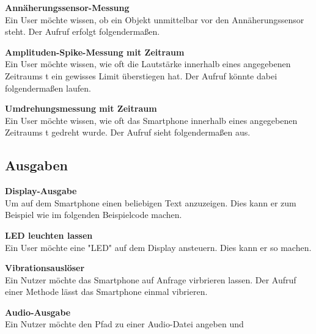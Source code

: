 \documentclass[11pt,a4paper]{report}
\begin{document}
\textbf{Annäherungssensor-Messung}\\
Ein User möchte wissen, ob ein Objekt unmittelbar vor den Annäherungssensor steht.
Der Aufruf erfolgt folgendermaßen.


\textbf{Amplituden-Spike-Messung mit Zeitraum}\\
Ein User möchte wissen, wie oft die Lautstärke innerhalb eines angegebenen Zeitraums t ein gewisses Limit überstiegen hat.
Der Aufruf könnte dabei folgendermaßen laufen.



\textbf{Umdrehungsmessung mit Zeitraum}\\
Ein User möchte wissen, wie oft das Smartphone innerhalb eines angegebenen Zeitraums t gedreht wurde.
Der Aufruf sieht folgendermaßen aus.



\subsection*{Ausgaben}\label{subsec:Ausgaben}

\textbf{Display-Ausgabe}\\
Um auf dem Smartphone einen beliebigen Text anzuzeigen.
Dies kann er zum Beispiel wie im folgenden Beispielcode machen.


\textbf{LED leuchten lassen}\\
Ein User möchte eine "LED" auf dem Display ansteuern.
Dies kann er so machen.


\textbf{Vibrationsauslöser}\\
Ein Nutzer möchte das Smartphone auf Anfrage virbrieren lassen.
Der Aufruf einer Methode lässt das Smartphone einmal vibrieren.


\textbf{Audio-Ausgabe}\\
Ein Nutzer möchte den Pfad zu einer Audio-Datei angeben und

\end{document}
